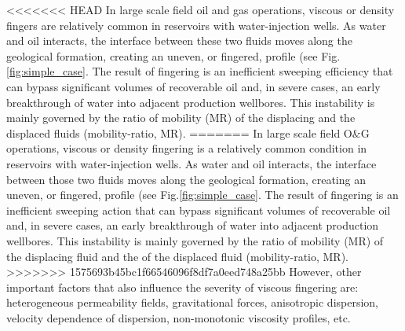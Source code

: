 \documentclass[preprint,authoryear,12pt]{elsarticle}
\begin{document}
\medskip
<<<<<<< HEAD
In large scale field oil and gas operations, viscous or density fingers are relatively common in reservoirs with water-injection wells. As water and oil interacts, the interface between these two fluids moves along the geological formation, creating an uneven, or fingered, profile (see Fig.\ref{fig:simple_case}. The result of fingering is an inefficient sweeping efficiency that can bypass significant volumes of recoverable oil and, in severe cases, an early breakthrough of water into adjacent production wellbores. This instability is mainly governed by the ratio of mobility (MR) of the displacing and the displaced fluids (mobility-ratio, MR). %
=======
In large scale field O$\&$G operations, viscous or density fingering is a relatively common condition in reservoirs with water-injection wells. As water and oil interacts, the interface between those two fluids moves along the geological formation, creating an uneven, or fingered, profile (see Fig.\ref{fig:simple_case}. The result of fingering is an inefficient sweeping action that can bypass significant volumes of recoverable oil and, in severe cases, an early breakthrough of water into adjacent production wellbores. This instability is mainly governed by the ratio of mobility (MR) of the displacing fluid and the of the displaced fluid (mobility-ratio, MR). %
>>>>>>> 1575693b45bc1f66546096f8df7a0eed748a25bb
However, other important factors that also influence the severity of viscous fingering are: heterogeneous permeability fields, gravitational forces, anisotropic dispersion, velocity dependence of dispersion, non-monotonic viscosity profiles, etc.


\end{document}
